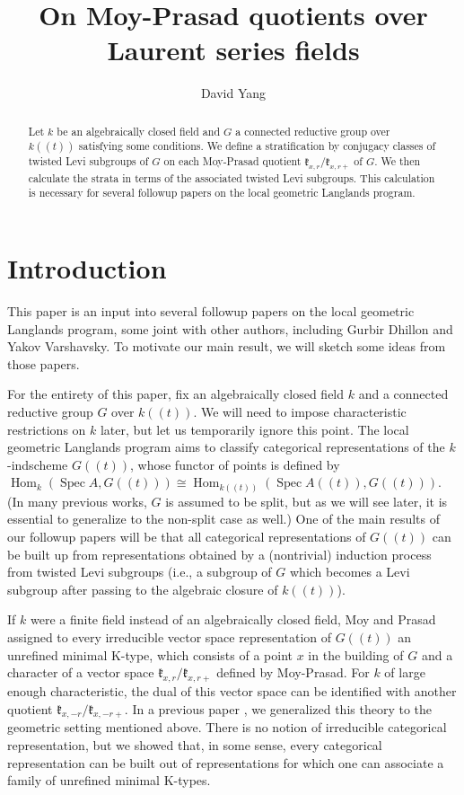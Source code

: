 \documentclass[12pt]{article}
\title{On Moy-Prasad quotients over Laurent series fields}
\author{David Yang}
\DeclareMathOperator{\Hom}{Hom}
\DeclareMathOperator{\Spec}{Spec}
\theoremstyle{remark}
\begin{document}
\maketitle

\begin{abstract}
Let $k$ be an algebraically closed field and $G$ a connected reductive group over $k((t))$ satisfying some conditions. We define a stratification by conjugacy classes of twisted Levi subgroups of $G$ on each Moy-Prasad quotient $\mathfrak{k}_{x,r}/\mathfrak{k}_{x,r+}$ of $G$. We then calculate the strata in terms of the associated twisted Levi subgroups. This calculation is necessary for several followup papers on the local geometric Langlands program.
\end{abstract}

\tableofcontents

\section{Introduction}

This paper is an input into several followup papers on the local geometric Langlands program, some joint with other authors, including Gurbir Dhillon and Yakov Varshavsky. To motivate our main result, we will sketch some ideas from those papers.

For the entirety of this paper, fix an algebraically closed field $k$ and a connected reductive group $G$ over $k((t)).$ We will need to impose characteristic restrictions on $k$ later, but let us temporarily ignore this point. The local geometric Langlands program aims to classify categorical representations of the $k$-indscheme $G((t))$, whose functor of points is defined by $\Hom_k(\Spec A,G((t)))\cong\Hom_{k((t))}(\Spec A((t)),G((t))).$ (In many previous works, $G$ is assumed to be split, but as we will see later, it is essential to generalize to the non-split case as well.) One of the main results of our followup papers will be that all categorical representations of $G((t))$ can be built up from representations obtained by a (nontrivial) induction process from twisted Levi subgroups (i.e., a subgroup of $G$ which becomes a Levi subgroup after passing to the algebraic closure of $k((t))$).

If $k$ were a finite field instead of an algebraically closed field, Moy and Prasad \cite{MP1} assigned to every irreducible vector space representation of $G((t))$ an unrefined minimal K-type, which consists of a point $x$ in the building of $G$ and a character of a vector space $\mathfrak{k}_{x,r}/\mathfrak{k}_{x,r+}$ defined by Moy-Prasad. For $k$ of large enough characteristic, the dual of this vector space can be identified with another quotient $\mathfrak{k}_{x,-r}/\mathfrak{k}_{x,-r+}$. In a previous paper \cite{yangMP}, we generalized this theory to the geometric setting mentioned above. There is no notion of irreducible categorical representation, but we showed that, in some sense, every categorical representation can be built out of representations for which one can associate a family of unrefined minimal K-types.
\end{document}
